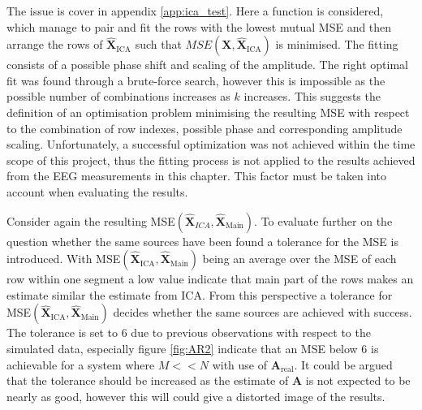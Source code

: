 The issue is cover in appendix \ref{app:ica_test}. 
Here a function is considered, which manage to pair and fit the rows with the lowest mutual MSE and then arrange the rows of $\hat{\textbf{X}}_{\text{ICA}}$ such that $MSE(\textbf{X},\hat{\textbf{X}}_{\text{ICA}})$ is minimised. 
The fitting consists of a possible phase shift and scaling of the amplitude. 
The right optimal fit was found through a brute-force search, however this is impossible as the possible number of combinations increases as $k$ increases. 
This suggests the definition of an optimisation problem minimising the resulting MSE with respect to the combination of row indexes, possible phase and corresponding amplitude scaling. 
Unfortunately, a successful optimization was not achieved within the time scope of this project, thus the fitting process is not applied to the results achieved from the EEG measurements in this chapter. 
This factor must be taken into account when evaluating the results.

Consider again the resulting MSE$(\hat{\textbf{X}}_{ICA},\hat{\textbf{X}}_{\text{Main}})$. 
To evaluate further on the question whether the same sources have been found a tolerance for the MSE is introduced. 
With MSE$(\hat{\textbf{X}}_{\text{ICA}},\hat{\textbf{X}}_{\text{Main}})$ being an average over the MSE of each row within one segment a low value indicate that main part of the rows makes an estimate similar the estimate from ICA. 
From this perspective a tolerance for MSE$(\hat{\textbf{X}}_{\text{ICA}},\hat{\textbf{X}}_{\text{Main}})$ decides whether the same sources are achieved with success. 
The tolerance is set to 6 due to previous observations with respect to the simulated data, especially figure \ref{fig:AR2} indicate that an MSE below 6 is achievable for a system where $M<<N$ with use of $\textbf{A}_{\text{real}}$. 
It could be argued that the tolerance should be increased as the estimate of $\textbf{A}$ is not expected to be nearly as good, however this will could give a distorted image of the results.          

